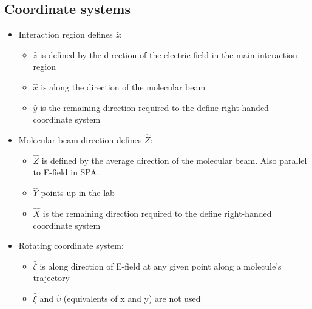 \subsection{Coordinate systems}
\begin{itemize}
    \item Interaction region defines $\hat{z}$:
    \begin{itemize}
        \item $\hat{z}$ is defined by the direction of the electric field in the main interaction region
        \item $\hat{x}$ is along the direction of the molecular beam
        \item $\hat{y}$ is the remaining direction required to the define right-handed coordinate system
    \end{itemize}
    
    \item Molecular beam direction defines $\hat{Z}$:
        \begin{itemize}
        \item $\hat{Z}$ is defined by the average direction of the molecular beam. Also parallel to E-field in SPA.
        \item $\hat{Y}$ points up in the lab
        \item $\hat{X}$ is the remaining direction required to the define right-handed coordinate system
    \end{itemize}
    
    \item Rotating coordinate system: 
    \begin{itemize}
        \item $\hat{\zeta}$ is along direction of E-field at any given point along a molecule's trajectory
        \item $\hat{\xi}$ and $\hat{\upsilon}$ (equivalents of x and y) are not used 
    \end{itemize}
\end{itemize}

